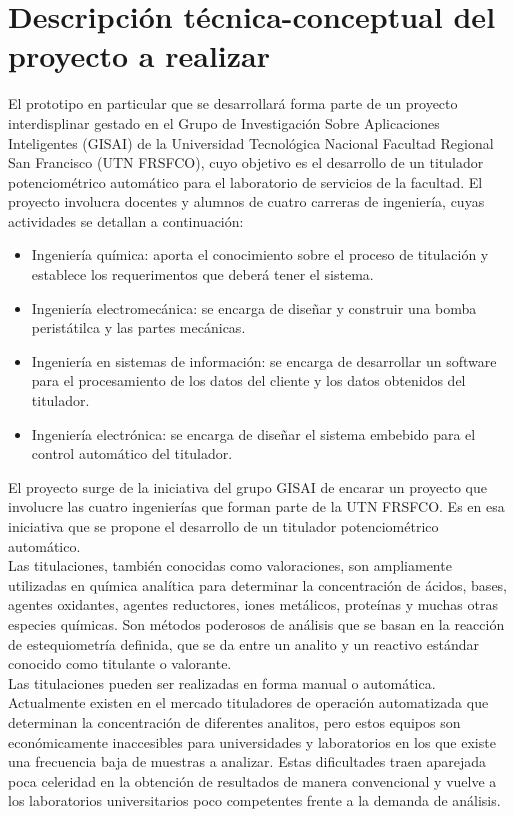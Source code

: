 \documentclass[11pt]{charter}
\begin{document}
\section{Descripción técnica-conceptual del proyecto a realizar}
\label{sec:descripcion}

El prototipo en particular que se desarrollará forma parte de un proyecto interdisplinar gestado en el Grupo de Investigación Sobre Aplicaciones Inteligentes (GISAI) de la Universidad Tecnológica Nacional Facultad Regional San Francisco (UTN FRSFCO), cuyo objetivo es el desarrollo de un titulador potenciométrico automático para el laboratorio de servicios de la facultad. El proyecto involucra docentes y alumnos de cuatro carreras de ingeniería, cuyas actividades se detallan a continuación:
\begin{itemize}
	\item Ingeniería química: aporta el conocimiento sobre el proceso de titulación y establece los requerimentos que deberá tener el sistema. 
	\item Ingeniería electromecánica: se encarga de diseñar y construir una bomba peristátilca y las partes mecánicas. 
	\item Ingeniería en sistemas de información: se encarga de desarrollar un software para el procesamiento de los datos del cliente y los datos obtenidos del titulador. 
	\item Ingeniería electrónica: se encarga de diseñar el sistema embebido para el control automático del titulador. 
\end{itemize}
El proyecto surge de la iniciativa del grupo GISAI de encarar un proyecto que involucre las cuatro ingenierías que forman parte de la UTN FRSFCO. Es en esa iniciativa que se propone el desarrollo de un titulador potenciométrico automático.\\
Las titulaciones, también conocidas como valoraciones, son ampliamente utilizadas en química analítica para determinar la concentración de ácidos, bases, agentes oxidantes, agentes reductores, iones metálicos, proteínas y muchas otras especies químicas. Son métodos poderosos de análisis que se basan en la reacción de estequiometría definida, que se da entre un analito y un reactivo estándar conocido como titulante o valorante.\\
Las titulaciones pueden ser realizadas en forma manual o automática. Actualmente existen en el mercado tituladores de operación automatizada que determinan la concentración de diferentes analitos, pero estos equipos son económicamente inaccesibles para universidades y laboratorios en los que existe una frecuencia baja de muestras a analizar. Estas dificultades traen aparejada poca celeridad en la obtención de resultados de manera convencional y vuelve a los laboratorios universitarios poco competentes frente a la demanda de análisis.\\
\end{document}
